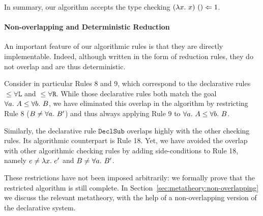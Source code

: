 In summary, our algorithm accepts the type checking $(\lam x)~() \Lto 1$.

\paragraph{Non-overlapping and Deterministic Reduction}
An important feature of our algorithmic rules is that they are directly
implementable. Indeed, although written in the form of reduction rules, they do
not overlap and are thus deterministic.

Consider in particular Rules 8 and 9, which correspond to the declarative rules
$\mathtt{{\le}\forall L}$ and $\mathtt{{\le}\forall R}$. While those
declarative rules both match the goal $\all A\le \all[b]B$,
we have eliminated this overlap in the algorithm by restricting Rule 8
($B\neq\all B'$) and thus always applying Rule 9 to $\all A\le \all[b]B$.

Similarly, the declarative rule $\mathtt{DeclSub}$ overlaps highly with the
other checking rules. Its algorithmic counterpart is Rule 18. Yet, we have
avoided the overlap with other algorithmic checking rules by adding
side-conditions to Rule 18, namely $e\neq\lam e'$ and $B\neq\all B'$.

These restrictions have not been imposed arbitrarily:
we formally prove that the restricted algorithm is still complete.
In Section~\ref{sec:metatheory:non-overlapping} we discuss the relevant metatheory,
with the help of a non-overlapping version of the declarative system.

